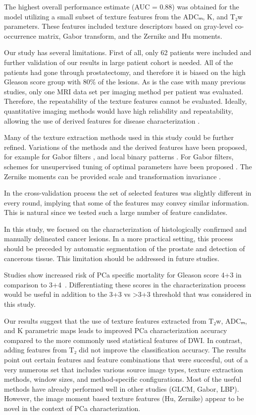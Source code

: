 The highest
overall performance estimate (AUC = 0.88) was obtained for the model utilizing a
small subset of texture features from the ADCₘ, K, and T₂w parameters. These
features included texture descriptors based on gray-level co-occurrence matrix,
Gabor transform, and the Zernike and Hu moments.

Our study has several limitations. First of all, only 62 patients were included
and further validation of our results in large patient cohort is needed. All of
the patients had gone through prostatectomy, and therefore it is biased on the
high Gleason score group with 80\% of the lesions. As is the case with many
previous studies, only one MRI data set per imaging method per patient was
evaluated. Therefore, the repeatability of the texture features cannot be
evaluated. Ideally, quantitative imaging methods would have high reliability and
repeatability, allowing the use of derived features for disease characterization
\citep{Shrout1979}.

Many of the texture extraction methods used in this study could be further
refined. Variations of the methods and the derived features have been proposed,
for example for Gabor filters \citep{Clausi2000}, and local binary patterns
\citep{Guo2012, Maenpaa2003}. For Gabor filters, schemes for unsupervised tuning
of optimal parameters have been proposed \citep{Teuner1995}. The Zernike moments
can be provided scale and transformation invariance \citep{Khotanzad1990}.

In the cross-validation process the set of selected features was slightly
different in every round, implying that some of the features may convey similar
information. This is natural since we tested such a large number of feature
candidates.

In this study, we focused on the characterization of histologically confirmed
and manually delineated cancer lesions. In a more practical setting, this
process should be preceded by automatic segmentation of the prostate and
detection of cancerous tissue. This limitation should be addressed in future
studies.

Studies show increased risk of PCa specific mortality for Gleason score 4+3 in
comparison to 3+4~\citep{Wright2009}. Differentiating these scores in the
characterization process would be useful in addition to the 3+3 vs >3+3
threshold that was considered in this study.

Our results suggest that the use of texture features extracted from T₂w, ADCₘ,
and K parametric maps leads to improved PCa characterization accuracy compared
to the more commonly used statistical features of DWI. In contrast, adding
features from T₂ did not improve the classification accuracy. The results
point out certain features and feature combinations that were succesful, out of
a very numerous set that includes various source image types, texture extraction
methods, window sizes, and method-specific configurations. Most of the useful
methods have already performed well in other studies (GLCM, Gabor, LBP).
However, the image moment based texture features (Hu, Zernike) appear to be
novel in the context of PCa characterization.
